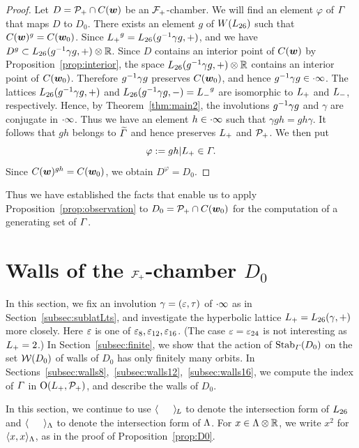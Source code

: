 \documentclass{amsart} %
\begin{document}
\begin{proof}
Let $D=\mathord{\mathcal{P}}_{+} \cap \mathord{C}(\boldsymbol{w})$ be an $\mathord{\mathcal{F}}_{+}$-chamber.
We will find an element $\varphi$ of $\varGamma$ 
that maps $D$ to $D_0$.
There exists an element $g$ of $W(L_{26})$
such that $\mathord{C}(\boldsymbol{w})^g=\mathord{C}(\boldsymbol{w}_0)$.
Since ${L_{+}}^g=L_{26}(g^{-1} \gamma g, +)$, 
and we have $D^g\subset L_{26}(g^{-1} \gamma g, +)\otimes \mathord{\mathbb{R}}$.
Since $D$ contains an interior point of $\mathord{C}(\boldsymbol{w})$ by 
Proposition~\ref{prop:interior},
the space $L_{26}(g^{-1} \gamma g, +)\otimes \mathord{\mathbb{R}}$ contains an interior point of $\mathord{C}(\boldsymbol{w}_0)$.
Therefore $g^{-1} \gamma g$ preserves $\mathord{C}(\boldsymbol{w}_0)$,
and hence $g^{-1} \gamma g \in \cdot \infty$.
The lattices $L_{26}(g^{-1} \gamma g, + )$ and $L_{26}(g^{-1} \gamma g, -)={L_{-}}^g$
are isomorphic to $L_{+}$ and $L_{-}$, respectively.
Hence, by Theorem~\ref{thm:main2},
the involutions $g^{-1} \gamma g$ and $\gamma$ are conjugate in $\cdot \infty$.
Thus we have an element $h\in \cdot \infty$
such that $\gamma g h =gh\gamma $.
It follows that $gh$ belongs to $\widetilde{\varGamma}$ and hence preserves $L_{+}$ and $\mathord{\mathcal{P}}_{+}$.
We then put
\[
\varphi:=gh|L_{+}\in \varGamma.
\]
Since $\mathord{C}(\boldsymbol{w})^{gh}=\mathord{C}(\boldsymbol{w}_0)$,
we obtain $D^\varphi=D_0$.
\end{proof}
%
%
Thus we have established the facts that enable us 
to apply Proposition~\ref{prop:observation}
to $D_0=\mathord{\mathcal{P}}_{+}\cap \mathord{C}(\boldsymbol{w}_0)$ 
for the computation of a generating set of
$\varGamma$.
%
%
\section{Walls of the $\mathord{\mathcal{F}}_{+}$-chamber $D_0$}\label{sec:wallsD0}
%
In this section, 
we fix an involution $\gamma=(\varepsilon, \tau)$ of $\cdot \infty$ as in Section~\ref{subsec:sublatLts},
 and  investigate the hyperbolic lattice $L_{+}=L_{26}(\gamma, +)$
 more closely.
 Here $\varepsilon$ is one of $\varepsilon_8, \varepsilon_{12}, \varepsilon_{16}$.
(The case $\varepsilon=\varepsilon_{24}$ is not interesting as $L_{+}=2$.)
In Section~\ref{subsec:finite},
we show that 
the action of $\operatorname{Stab}_{\varGamma}(D_0)$ on the set $\mathord{\mathcal{W}}(D_0)$ of 
walls of $D_0$ has only finitely many orbits.
In Sections~\ref{subsec:walls8},~\ref{subsec:walls12},~\ref{subsec:walls16}, 
we compute the index of $\varGamma$ in
$\mathord{\mathrm{O}}(L_{+}, \mathord{\mathcal{P}}_{+})$,
and describe the walls of $D_0$.
%
\par
In this section,
we continue to use
$\langle \phantom{a, a} \rangle_{\hskip -1pt L}$ to denote the intersection form of $L_{26}$
and $\langle \phantom{a, a} \rangle_{\Lambda}$ to denote the intersection form of $\Lambda$.
For $x\in \Lambda\otimes\mathord{\mathbb{R}}$, we write $x^2$ for $\langle x,x \rangle_{\Lambda}$,
as in the proof of Proposition~\ref{prop:D0}.
%
\end{document}
